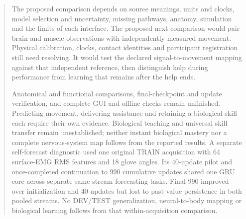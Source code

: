 \documentclass[11pt,a4paper]{article}
\renewcommand{\_}{\char95\relax}
\begin{document}
\begin{abstract}
The proposed comparison depends on source meanings, units and clocks, model selection and uncertainty, missing pathways, anatomy, simulation and the limits of each interface. The proposed next comparison would pair brain and muscle observations with independently measured movement. Physical calibration, clocks, contact identities and participant registration still need resolving. It would test the declared signal-to-movement mapping against that independent reference, then distinguish help during performance from learning that remains after the help ends.

Anatomical and functional comparisons, final-checkpoint and update verification, and complete GUI and offline checks remain unfinished. Predicting movement, delivering assistance and retaining a biological skill each require their own evidence. Biological teaching and universal skill transfer remain unestablished; neither instant biological mastery nor a complete nervous-system map follows from the reported results.
A separate self-forecast diagnostic used one original TRAIN acquisition with 64 surface-EMG RMS features and 18 glove angles. Its 40-update pilot and once-completed continuation to 990 cumulative updates shared one GRU core across separate same-stream forecasting tasks. Final 990 improved over initialization and 40 updates but lost to past-value persistence in both pooled streams. No DEV/TEST generalization, neural-to-body mapping or biological learning follows from that within-acquisition comparison.
\end{abstract}
\tableofcontents\clearpage



\clearpage

\par

\begingroup

\endgroup
\clearpage
\appendix


\end{document}
